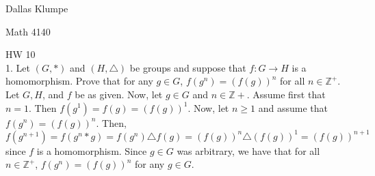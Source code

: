 \documentclass[12pt]{article}
\begin{document}
\noindent Dallas Klumpe

\noindent Math 4140

\noindent HW 10\\

1. Let $(G,*)$ and $(H,\triangle)$ be groups and suppose that $f:G\rightarrow H$ is a homomorphism. Prove that for any $g\in G$, $f(g^n)=(f(g))^n$ for all $n\in\mathbb{Z}^+$.\\
Let $G, H$, and $f$ be as given. Now, let $g\in G$ and $n\in\mathbb{Z}+$. Assume first that $n=1$. Then $f(g^1)=f(g)=(f(g))^1$. Now, let $n\geq1$ and assume that $f(g^n)=(f(g))^n$. Then, $f(g^{n+1})=f(g^n*g)=f(g^n)\triangle f(g)=(f(g))^n\triangle (f(g))^1=(f(g))^{n+1}$ since $f$ is a homomorphism. Since $g\in G$ was arbitrary, we have that for all $n\in\mathbb{Z}^+$, $f(g^n)=(f(g))^n$ for any $g\in G$.\\[20pt]
\end{document}
